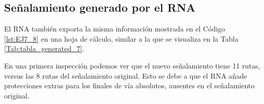 \subsection{Señalamiento generado por el RNA}

    El RNA también exporta la misma información mostrada en el Código \ref{lst:EJ7_8} en una hoja de cálculo, similar a la que se visualiza en la Tabla \ref{Tab:tabla_generated_7}.
    
    \begin{table}[H]
        {
        \caption{Tabla de enclavamiento del ejemplo 7 generada por el RNA.}
        \label{Tab:tabla_generated_7}
        \centering
     }
    \end{table}
    
    En una primera inspección podemos ver que el nuevo señalamiento tiene 11 rutas, versus las 8 rutas del señalamiento original. Esto se debe a que el RNA añade protecciones extras para los finales de vía absolutos, ausentes en el señalamiento original.